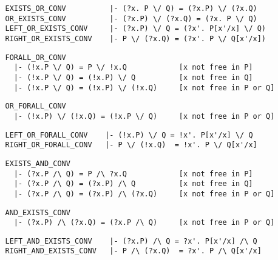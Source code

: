\begin{hol}\begin{verbatim}
   EXISTS_OR_CONV          |- (?x. P \/ Q) = (?x.P) \/ (?x.Q)
   OR_EXISTS_CONV          |- (?x.P) \/ (?x.Q) = (?x. P \/ Q)
   LEFT_OR_EXISTS_CONV     |- (?x.P) \/ Q = (?x'. P[x'/x] \/ Q)
   RIGHT_OR_EXISTS_CONV    |- P \/ (?x.Q) = (?x'. P \/ Q[x'/x])
\end{verbatim}\end{hol}

\begin{hol}\begin{verbatim}
   FORALL_OR_CONV
     |- (!x.P \/ Q) = P \/ !x.Q            [x not free in P]
     |- (!x.P \/ Q) = (!x.P) \/ Q          [x not free in Q]
     |- (!x.P \/ Q) = (!x.P) \/ (!x.Q)     [x not free in P or Q]
\end{verbatim}\end{hol}

\begin{hol}\begin{verbatim}
   OR_FORALL_CONV
     |- (!x.P) \/ (!x.Q) = (!x.P \/ Q)     [x not free in P or Q]
\end{verbatim}\end{hol}

\begin{hol}\begin{verbatim}
   LEFT_OR_FORALL_CONV    |- (!x.P) \/ Q = !x'. P[x'/x] \/ Q
   RIGHT_OR_FORALL_CONV   |- P \/ (!x.Q)  = !x'. P \/ Q[x'/x]
\end{verbatim}\end{hol}

\begin{hol}\begin{verbatim}
   EXISTS_AND_CONV
     |- (?x.P /\ Q) = P /\ ?x.Q            [x not free in P]
     |- (?x.P /\ Q) = (?x.P) /\ Q          [x not free in Q]
     |- (?x.P /\ Q) = (?x.P) /\ (?x.Q)     [x not free in P or Q]
\end{verbatim}\end{hol}

\begin{hol}\begin{verbatim}
   AND_EXISTS_CONV
     |- (?x.P) /\ (?x.Q) = (?x.P /\ Q)     [x not free in P or Q]
\end{verbatim}\end{hol}

\begin{hol}\begin{verbatim}
   LEFT_AND_EXISTS_CONV    |- (?x.P) /\ Q = ?x'. P[x'/x] /\ Q
   RIGHT_AND_EXISTS_CONV   |- P /\ (?x.Q)  = ?x'. P /\ Q[x'/x]
\end{verbatim}\end{hol}

